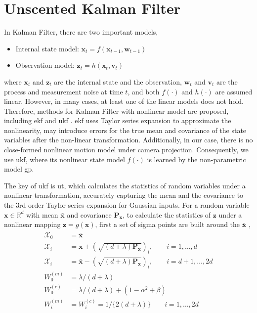 \section{Unscented Kalman Filter}
In Kalman Filter, there are two important models, 
\begin{itemize}
\item Internal state model: $\mathbf{x}_t = f(\mathbf{x}_{t-1}, \mathbf{w}_{t-1})$
\item Observation model: $\mathbf{z}_t = h(\mathbf{x}_t, \mathbf{v}_t)$
\end{itemize}
where $\mathbf{x}_t$ and $\mathbf{z}_t$ are the internal state and the observation,
$\mathbf{w}_t$ and $\mathbf{v}_t$ are the process and measurement noise at time $t$, 
and both $f(\cdot)$ and $h(\cdot)$ are assumed linear. 
However, in many cases, at least one of the linear models does not hold. Therefore, methods for Kalman Filter with nonlinear model are proposed, including \gls{ekf} \cite{julier1997new} and \gls{ukf} \cite{wan2000unscented}. 
\gls{ekf} uses Taylor series expansion to approximate the nonlinearity, may introduce errors for the true mean and covariance of the state variables after the non-linear transformation.
Additionally, in our case, there is no close-formed nonlinear motion model under camera projection. 
Consequently, we use \gls{ukf}, where its nonlinear state model $f(\cdot)$ is learned by the non-parametric model \gls{gp}.

% 

The key of \gls{ukf} is \gls{ut}, which calculates the statistics of random variables under a nonlinear transformation, accurately capturing the mean and the covariance to the 3rd order Taylor series expansion for Gaussian inputs. 
For a random variable $\mathbf{x} \in \mathbb{R}^{d}$ with mean $\bar{\mathbf{x}}$ and covariance $\mathbf{P_x}$, to calculate the statistics of $\mathbf{z}$ under a nonlinear mapping $\mathbf{z} = g(\mathbf{x})$, first a set of sigma points are built around the $\bar{\mathbf{x}}$ \cite{wan2000unscented},
\begin{align}
\begin{split}
\mathcal{X}_0 & = \bar{\mathbf{x}} \\
\mathcal{X}_i & = \bar{\mathbf{x}} + (\sqrt{(d+\lambda)\mathbf{P_x}})_i, \qquad i = 1, \dots, d\\
\mathcal{X}_i & = \bar{\mathbf{x}} - (\sqrt{(d+\lambda)\mathbf{P_x}})_i, \qquad i = d+1, \dots, 2d\\
W_0^{(m)} & = \lambda/(d+\lambda) \\
W_0^{(c)} & = \lambda/(d+\lambda) + (1-\alpha^2+\beta) \\
W_i^{(m)} & = W_i^{(c)} = 1/\{2(d+\lambda)\} \qquad i = 1, \dots, 2d
\end{split}
\end{align}

